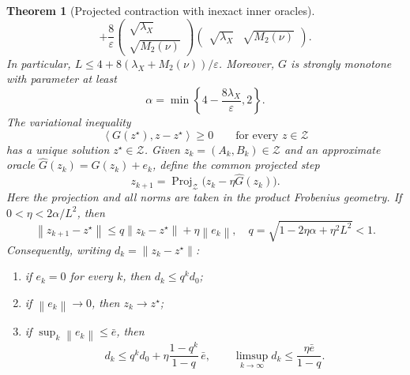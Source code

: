 \documentclass[11pt]{article}
\newcommand{\ip}[2]{\left\langle #1,#2\right\rangle}
\newcommand{\norm}[1]{\left\lVert #1\right\rVert}
\theoremstyle{plain}
\newtheorem{theorem}{Theorem}[section]
\theoremstyle{definition}
\theoremstyle{remark}
\begin{document}
\begin{theorem}[Projected contraction with inexact inner oracles]
\[ +\frac8\varepsilon
 \begin{pmatrix}\sqrt{\lambda_X}\\\sqrt{M_2(\nu)}\end{pmatrix}
 \begin{pmatrix}\sqrt{\lambda_X}&\sqrt{M_2(\nu)}\end{pmatrix}.
\]
In particular,
\(L\le4+8(\lambda_X+M_2(\nu))/\varepsilon\). Moreover, \(G\) is strongly
monotone with parameter
at least
\[
  \alpha=\min\left\{4-\frac{8\lambda_X}{\varepsilon},2\right\}.
\]
The variational inequality
\[
 \ip{G(z^\star)}{z-z^\star}\ge0
 \qquad\text{for every }z\in\mathcal Z
\]
has a unique solution \(z^\star\in\mathcal Z\). Given
\(z_k=(A_k,B_k)\in\mathcal Z\) and an approximate oracle
\(\widehat G(z_k)=G(z_k)+e_k\), define the common projected step
\[
  z_{k+1}=\operatorname{Proj}_{\mathcal Z}
  \bigl(z_k-\eta\widehat G(z_k)\bigr).
\]
Here the projection and all norms are taken in the product Frobenius geometry.
If
\(0<\eta<2\alpha/L^2\), then
\[
  \norm{z_{k+1}-z^\star}\le q\norm{z_k-z^\star}+\eta\norm{e_k},
  \quad q=\sqrt{1-2\eta\alpha+\eta^2L^2}<1.
\]
Consequently, writing \(d_k=\norm{z_k-z^\star}\):
\begin{enumerate}[label=(\roman*)]
\item if \(e_k=0\) for every \(k\), then \(d_k\le q^k d_0\);
\item if \(\norm{e_k}\to0\), then \(z_k\to z^\star\);
\item if \(\sup_k\norm{e_k}\le\bar e\), then
\[
 d_k\le q^k d_0+\eta\frac{1-q^k}{1-q}\,\bar e,
 \qquad
 \limsup_{k\to\infty}d_k\le\frac{\eta\bar e}{1-q}.
\]
\end{enumerate}
\end{theorem}
\end{document}

